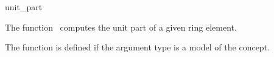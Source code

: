 \begin{ccRefFunction}{unit_part}

\ccDefinition

The function \ccRefName\ computes the unit part of a given ring 
element. 

The function is defined if the argument type 
is a model of the  concept. 


{}


\ccSeeAlso

\\
\\

\end{ccRefFunction}
